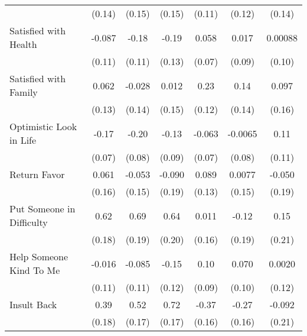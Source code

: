 {\begin{tabular}{l*{6}{c}}
            &      (0.14)         &      (0.15)         &      (0.15)         &      (0.11)         &      (0.12)         &      (0.14)         \\
\addlinespace
Satisfied with Health&      -0.087         &       -0.18         &       -0.19         &       0.058         &       0.017         &     0.00088         \\
            &      (0.11)         &      (0.11)         &      (0.13)         &      (0.07)         &      (0.09)         &      (0.10)         \\
\addlinespace
Satisfied with Family&       0.062         &      -0.028         &       0.012         &        0.23\sym{*}  &        0.14         &       0.097         \\
            &      (0.13)         &      (0.14)         &      (0.15)         &      (0.12)         &      (0.14)         &      (0.16)         \\
\addlinespace
Optimistic Look in Life&       -0.17\sym{*}  &       -0.20\sym{*}  &       -0.13         &      -0.063         &     -0.0065         &        0.11         \\
            &      (0.07)         &      (0.08)         &      (0.09)         &      (0.07)         &      (0.08)         &      (0.11)         \\
\addlinespace
Return Favor&       0.061         &      -0.053         &      -0.090         &       0.089         &      0.0077         &      -0.050         \\
            &      (0.16)         &      (0.15)         &      (0.19)         &      (0.13)         &      (0.15)         &      (0.19)         \\
\addlinespace
Put Someone in Difficulty&        0.62\sym{***}&        0.69\sym{***}&        0.64\sym{**} &       0.011         &       -0.12         &        0.15         \\
            &      (0.18)         &      (0.19)         &      (0.20)         &      (0.16)         &      (0.19)         &      (0.21)         \\
\addlinespace
Help Someone Kind To Me&      -0.016         &      -0.085         &       -0.15         &        0.10         &       0.070         &      0.0020         \\
            &      (0.11)         &      (0.11)         &      (0.12)         &      (0.09)         &      (0.10)         &      (0.12)         \\
\addlinespace
Insult Back &        0.39\sym{*}  &        0.52\sym{**} &        0.72\sym{***}&       -0.37\sym{*}  &       -0.27         &      -0.092         \\
            &      (0.18)         &      (0.17)         &      (0.17)         &      (0.16)         &      (0.16)         &      (0.21)         \\
\bottomrule
\end{tabular}
}
